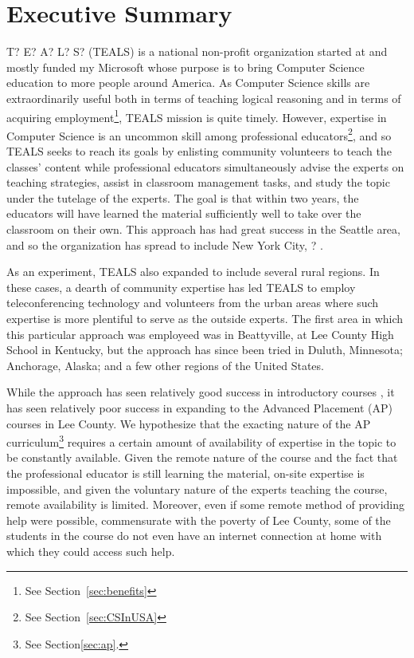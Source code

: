 
\section{Executive Summary}

T? E? A? L? S? (TEALS) is a national non-profit organization started at and
mostly funded my Microsoft whose purpose is to bring Computer Science education
to more people around America. As Computer Science skills are extraordinarily
useful both in terms of teaching logical reasoning\cite{????} and in terms of
acquiring employment\cite{????}\footnote{See Section~\ref{sec:benefits}}, TEALS mission is quite timely. However,
expertise in Computer Science is an uncommon skill among professional educators\footnote{See Section~\ref{sec:CSInUSA}},
and so TEALS seeks to reach its goals by enlisting community volunteers to teach
the classes' content while professional educators simultaneously advise the
experts on teaching strategies, assist in classroom management tasks, and
study the topic under the tutelage of the experts. The goal is that within two
years, the educators will have learned the material sufficiently well to take
over the classroom on their own\cite{TEALS Brochure?}. This approach has had great success in the Seattle area\cite{Statistics?}, and
so the organization has spread to include New York City, ? \cite{TEALS
Brochure?}.

As an experiment, TEALS also expanded to include several rural regions. In these
cases, a dearth of community expertise has led TEALS to employ teleconferencing
technology and volunteers from the urban areas where such expertise is more
plentiful to serve as the outside experts. The first area in which this
particular approach was employeed was in Beattyville, at Lee County High School
in Kentucky, but the approach has since been tried in Duluth, Minnesota;
Anchorage, Alaska; and a few other regions of the United States\cite{some
public statistics about expansion}.

While the approach has seen relatively good success in introductory courses
\cite{WoolyWormVideo}, it has seen relatively poor success in expanding to
the Advanced Placement (AP) courses in Lee County. We hypothesize that the
exacting nature of the AP curriculum\footnote{See Section\ref{sec:ap}.}
requires a certain amount of availability
of expertise in the topic to be constantly available. Given the remote nature of
the course and the fact that the professional educator is still learning the
material, on-site expertise is impossible, and given the voluntary nature of the
experts teaching the course, remote availability is limited. Moreover, even if
some remote method of providing help were possible, commensurate with the
poverty of Lee County, some of the students in the course do not even have an
internet connection at home with which they could access such help.


